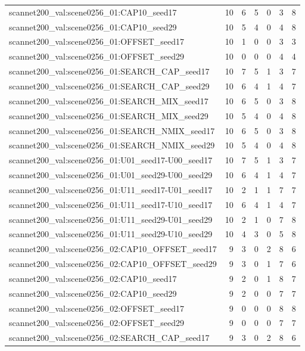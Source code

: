 \begin{table}[t]
\begin{tabular}{lrrrrrr}
scannet200\_val:scene0256\_01:CAP10\_seed17 & 10 & 6 & 5 & 0 & 3 & 8 \\
scannet200\_val:scene0256\_01:CAP10\_seed29 & 10 & 5 & 4 & 0 & 4 & 8 \\
scannet200\_val:scene0256\_01:OFFSET\_seed17 & 10 & 1 & 0 & 0 & 3 & 3 \\
scannet200\_val:scene0256\_01:OFFSET\_seed29 & 10 & 0 & 0 & 0 & 4 & 4 \\
scannet200\_val:scene0256\_01:SEARCH\_CAP\_seed17 & 10 & 7 & 5 & 1 & 3 & 7 \\
scannet200\_val:scene0256\_01:SEARCH\_CAP\_seed29 & 10 & 6 & 4 & 1 & 4 & 7 \\
scannet200\_val:scene0256\_01:SEARCH\_MIX\_seed17 & 10 & 6 & 5 & 0 & 3 & 8 \\
scannet200\_val:scene0256\_01:SEARCH\_MIX\_seed29 & 10 & 5 & 4 & 0 & 4 & 8 \\
scannet200\_val:scene0256\_01:SEARCH\_NMIX\_seed17 & 10 & 6 & 5 & 0 & 3 & 8 \\
scannet200\_val:scene0256\_01:SEARCH\_NMIX\_seed29 & 10 & 5 & 4 & 0 & 4 & 8 \\
scannet200\_val:scene0256\_01:U01\_seed17-U00\_seed17 & 10 & 7 & 5 & 1 & 3 & 7 \\
scannet200\_val:scene0256\_01:U01\_seed29-U00\_seed29 & 10 & 6 & 4 & 1 & 4 & 7 \\
scannet200\_val:scene0256\_01:U11\_seed17-U01\_seed17 & 10 & 2 & 1 & 1 & 7 & 7 \\
scannet200\_val:scene0256\_01:U11\_seed17-U10\_seed17 & 10 & 6 & 4 & 1 & 4 & 7 \\
scannet200\_val:scene0256\_01:U11\_seed29-U01\_seed29 & 10 & 2 & 1 & 0 & 7 & 8 \\
scannet200\_val:scene0256\_01:U11\_seed29-U10\_seed29 & 10 & 4 & 3 & 0 & 5 & 8 \\
scannet200\_val:scene0256\_02:CAP10\_OFFSET\_seed17 & 9 & 3 & 0 & 2 & 8 & 6 \\
scannet200\_val:scene0256\_02:CAP10\_OFFSET\_seed29 & 9 & 3 & 0 & 1 & 7 & 6 \\
scannet200\_val:scene0256\_02:CAP10\_seed17 & 9 & 2 & 0 & 1 & 8 & 7 \\
scannet200\_val:scene0256\_02:CAP10\_seed29 & 9 & 2 & 0 & 0 & 7 & 7 \\
scannet200\_val:scene0256\_02:OFFSET\_seed17 & 9 & 0 & 0 & 0 & 8 & 8 \\
scannet200\_val:scene0256\_02:OFFSET\_seed29 & 9 & 0 & 0 & 0 & 7 & 7 \\
scannet200\_val:scene0256\_02:SEARCH\_CAP\_seed17 & 9 & 3 & 0 & 2 & 8 & 6 \\

\end{tabular}
\end{table}
